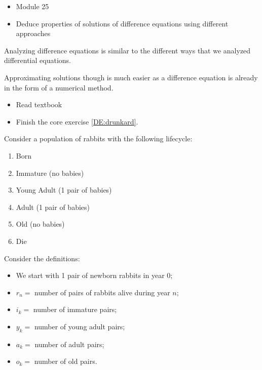 \begin{lesson}




	\begin{itemize}
		\item Module 25
	\end{itemize}

	\begin{itemize}
		\item Deduce properties of solutions of difference equations using different approaches
	\end{itemize}
	


Analyzing difference equations is similar to the different ways that we analyzed differential equations.

Approximating solutions though is much easier as a difference equation is already in the form of a numerical method.


\begin{itemize}
	\item Read textbook
	\item Finish the core exercise \ref{DE:drunkard}.
\end{itemize}

\end{lesson}


\begin{minipage}{.45\textwidth}
\question \label{rabbitscomplicatedproof}
	Consider a population of rabbits with the following lifecycle:
	\begin{enumerate}[start=0,label=(year \arabic*)]
		\item Born
		\item Immature (no babies)
		\item Young Adult (1 pair of babies)
		\item Adult (1 pair of babies)
		\item Old (no babies)
		\item Die \\[5pt]
	\end{enumerate}	
	
\end{minipage}
\qquad
\begin{minipage}{.45\textwidth}
	Consider the definitions:
	\begin{itemize}
		\item We start with 1 pair of newborn rabbits in year 0;
		\item $r_n=$ number of pairs of rabbits alive during year $n$;
		\item $i_k=$ number of immature pairs;
		\item $y_k=$ number of young adult pairs;
		\item $a_k=$ number of adult pairs;
		\item $o_k=$ number of old pairs.
	\end{itemize}

\end{minipage}

